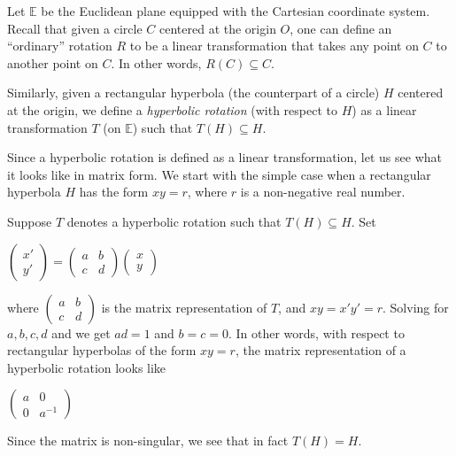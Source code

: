 \documentclass[12pt]{article}
\begin{document}
Let $\mathbb{E}$ be the Euclidean plane equipped with the Cartesian coordinate system.  Recall that given a circle $C$ centered at the origin $O$, one can define an ``ordinary'' rotation $R$ to be a linear transformation that takes any point on $C$ to another point on $C$.  In other words, $R(C)\subseteq C$.  

Similarly, given a rectangular hyperbola (the counterpart of a circle) $H$ centered at the origin, we define a \emph{hyperbolic rotation} (with respect to $H$) as a linear transformation $T$ (on $\mathbb{E}$) such that $T(H)\subseteq H$.

Since a hyperbolic rotation is defined as a linear transformation, let us see what it looks like in matrix form.  We start with the simple case when a rectangular hyperbola $H$ has the form $xy=r$, where $r$ is a non-negative real number.

Suppose $T$ denotes a hyperbolic rotation such that $T(H)\subseteq H$.  Set 
\begin{center}
$
\begin{pmatrix}
x' \\
y'
\end{pmatrix}
=
\begin{pmatrix}
a & b \\
c & d
\end{pmatrix}
\begin{pmatrix}
x \\
y
\end{pmatrix}
$
\end{center}
where $\begin{pmatrix}
a & b \\
c & d
\end{pmatrix}$
is the matrix representation of $T$, and $xy=x'y'=r$.  Solving for $a,b,c,d$ and we get $ad=1$ and $b=c=0$.  In other words, with respect to rectangular hyperbolas of the form $xy=r$, the matrix representation of a hyperbolic rotation looks like
\begin{center}
$
\begin{pmatrix}
a & 0 \\
0 & a^{-1}
\end{pmatrix}
$
\end{center}
Since the matrix is non-singular, we see that in fact $T(H)=H$.
\end{document}
